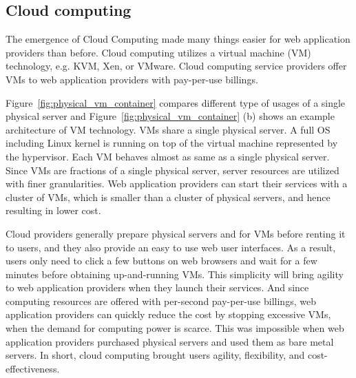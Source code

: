 \subsection{Cloud computing}

The emergence of Cloud Computing made many things easier for web application providers than before.
Cloud computing utilizes a virtual machine (VM) technology, e.g. KVM, Xen, or VMware.
Cloud computing service providers offer VMs to web application providers with pay-per-use billings.

Figure~\ref{fig:physical_vm_container} compares different type of usages of a single physical server and Figure~\ref{fig:physical_vm_container} (b) shows an example architecture of VM technology.
VMs share a single physical server.
A full OS including Linux kernel is running on top of the virtual machine represented by the hypervisor.
Each VM behaves almost as same as a single physical server.
Since VMs are fractions of a single physical server, server resources are utilized with finer granularities.
Web application providers can start their services with a cluster of VMs, which is smaller than a cluster of physical servers, and hence resulting in lower cost.

Cloud providers generally prepare physical servers and  for VMs before renting it to users, and they also provide an easy to use web user interfaces.
As a result, users only need to click a few buttons on web browsers and wait for a few minutes before obtaining up-and-running VMs.
This simplicity will bring agility to web application providers when they launch their services.
And since computing resources are offered with per-second pay-per-use billings, web application providers can quickly reduce the cost by stopping excessive VMs, when the demand for computing power is scarce.
This was impossible when web application providers purchased physical servers and used them as bare metal servers.
In short, cloud computing brought users agility, flexibility, and cost-effectiveness.

